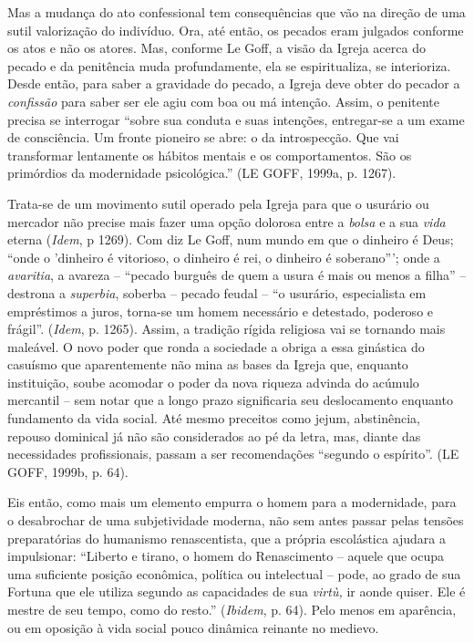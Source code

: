 Mas a mudança do ato confessional tem consequências que vão na direção
de uma sutil valorização do indivíduo. Ora, até então, os pecados eram
julgados conforme os atos e não os atores. Mas, conforme Le Goff, a
visão da Igreja acerca do pecado e da penitência muda profundamente, ela
se espiritualiza, se interioriza. Desde então, para saber a gravidade do
pecado, a Igreja deve obter do pecador a \emph{confissão} para saber ser
ele agiu com boa ou má intenção. Assim, o penitente precisa se
interrogar ``sobre sua conduta e suas intenções, entregar-se a um exame
de consciência. Um fronte pioneiro se abre: o da introspecção. Que vai
transformar lentamente os hábitos mentais e os comportamentos. São os
primórdios da modernidade psicológica.'' (LE GOFF, 1999a, p. 1267).

Trata-se de um movimento sutil operado pela Igreja para que o usurário
ou mercador não precise mais fazer uma opção dolorosa entre a
\emph{bolsa} e a sua \emph{vida} eterna (\emph{Idem}, p 1269). Com diz
Le Goff, num mundo em que o dinheiro é Deus; ``onde o 'dinheiro é
vitorioso, o dinheiro é rei, o dinheiro é soberano'''; onde a
\emph{avaritia}, a avareza -- ``pecado burguês de quem a usura é mais ou
menos a filha'' -- destrona a \emph{superbia}, soberba -- pecado feudal
-- ``o usurário, especialista em empréstimos a juros, torna-se um homem
necessário e detestado, poderoso e frágil''. (\emph{Idem}, p. 1265).
Assim, a tradição rígida religiosa vai se tornando mais maleável. O novo
poder que ronda a sociedade a obriga a essa ginástica do casuísmo que
aparentemente não mina as bases da Igreja que, enquanto instituição,
soube acomodar o poder da nova riqueza advinda do acúmulo mercantil --
sem notar que a longo prazo significaria seu deslocamento enquanto
fundamento da vida social. Até mesmo preceitos como jejum, abstinência,
repouso dominical já não são considerados ao pé da letra, mas, diante
das necessidades profissionais, passam a ser recomendações ``segundo o
espírito''. (LE GOFF, 1999b, p. 64).

Eis então, como mais um elemento empurra o homem para a modernidade,
para o desabrochar de uma subjetividade moderna, não sem antes passar
pelas tensões preparatórias do humanismo renascentista, que a própria
escolástica ajudara a impulsionar: ``Liberto e tirano, o homem do
Renascimento -- aquele que ocupa uma suficiente posição econômica,
política ou intelectual -- pode, ao grado de sua Fortuna que ele utiliza
segundo as capacidades de sua \emph{virtù,} ir aonde quiser. Ele é
mestre de seu tempo, como do resto.'' (\emph{Ibidem}, p. 64). Pelo menos
em aparência, ou em oposição à vida social pouco dinâmica reinante no
medievo.

